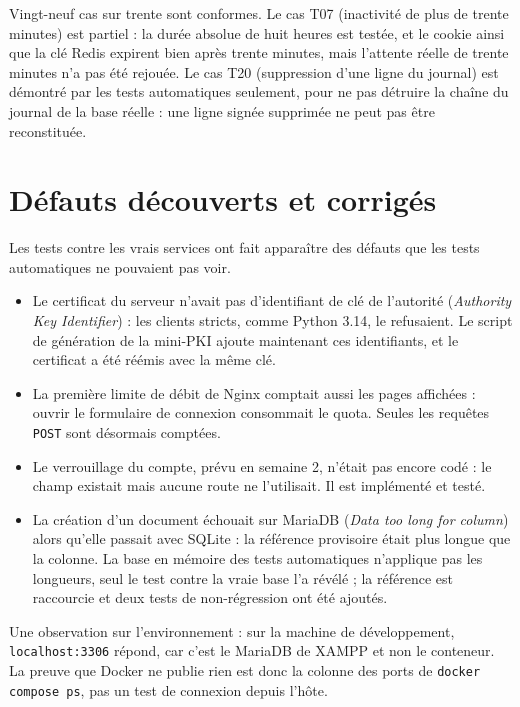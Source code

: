 \documentclass[12pt,a4paper]{report}
\newcommand{\code}[1]{\texttt{\NoAutoSpacing #1}}
\begin{document}
Vingt-neuf cas sur trente sont conformes. Le cas T07 (inactivité de plus de trente minutes) est partiel : la durée absolue de huit heures est testée, et le cookie ainsi que la clé Redis expirent bien après trente minutes, mais l'attente réelle de trente minutes n'a pas été rejouée. Le cas T20 (suppression d'une ligne du journal) est démontré par les tests automatiques seulement, pour ne pas détruire la chaîne du journal de la base réelle : une ligne signée supprimée ne peut pas être reconstituée.

\section{Défauts découverts et corrigés}

Les tests contre les vrais services ont fait apparaître des défauts que les tests automatiques ne pouvaient pas voir.

\begin{itemize}
  \item Le certificat du serveur n'avait pas d'identifiant de clé de l'autorité (\emph{Authority Key Identifier}) : les clients stricts, comme Python 3.14, le refusaient. Le script de génération de la mini-PKI ajoute maintenant ces identifiants, et le certificat a été réémis avec la même clé.
  \item La première limite de débit de Nginx comptait aussi les pages affichées : ouvrir le formulaire de connexion consommait le quota. Seules les requêtes \code{POST} sont désormais comptées.
  \item Le verrouillage du compte, prévu en semaine 2, n'était pas encore codé : le champ existait mais aucune route ne l'utilisait. Il est implémenté et testé.
  \item La création d'un document échouait sur MariaDB (\emph{Data too long for column}) alors qu'elle passait avec SQLite : la référence provisoire était plus longue que la colonne. La base en mémoire des tests automatiques n'applique pas les longueurs, seul le test contre la vraie base l'a révélé ; la référence est raccourcie et deux tests de non-régression ont été ajoutés.
\end{itemize}

\begin{sloppypar}
Une observation sur l'environnement : sur la machine de développement, \code{localhost:3306} répond, car c'est le MariaDB de XAMPP et non le conteneur. La preuve que Docker ne publie rien est donc la colonne des ports de \code{docker compose ps}, pas un test de connexion depuis l'hôte.
\end{sloppypar}
\end{document}
